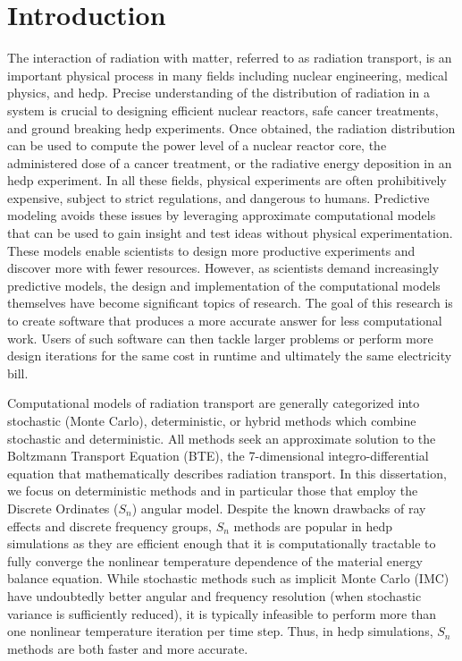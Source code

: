 \documentclass[../doc.tex]{subfiles}
\begin{document}
\chapter{Introduction}
The interaction of radiation with matter, referred to as radiation transport, is an important physical process in many fields including nuclear engineering, medical physics, and \gls{hedp}. Precise understanding of the distribution of radiation in a system is crucial to designing efficient nuclear reactors, safe cancer treatments, and ground breaking \gls{hedp} experiments. Once obtained, the radiation distribution can be used to compute the power level of a nuclear reactor core, the administered dose of a cancer treatment, or the radiative energy deposition in an \gls{hedp} experiment. In all these fields, physical experiments are often prohibitively expensive, subject to strict regulations, and dangerous to humans. Predictive modeling avoids these issues by leveraging approximate computational models that can be used to gain insight and test ideas without physical experimentation. These models enable scientists to design more productive experiments and discover more with fewer resources. However, as scientists demand increasingly predictive models, the design and implementation of the computational models themselves have become significant topics of research. The goal of this research is to create software that produces a more accurate answer for less computational work. Users of such software can then tackle larger problems or perform more design iterations for the same cost in runtime and ultimately the same electricity bill. 

Computational models of radiation transport are generally categorized into stochastic (Monte Carlo), deterministic, or hybrid methods which combine stochastic and deterministic. All methods seek an approximate solution to the Boltzmann Transport Equation (BTE), the 7-dimensional integro-differential equation that mathematically describes radiation transport. In this dissertation, we focus on deterministic methods and in particular those that employ the Discrete Ordinates ($S_n$) angular model. Despite the known drawbacks of ray effects and discrete frequency groups, $S_n$ methods are popular in \gls{hedp} simulations as they are efficient enough that it is computationally tractable to fully converge the nonlinear temperature dependence of the material energy balance equation. While stochastic methods such as implicit Monte Carlo (IMC) have undoubtedly better angular and frequency resolution (when stochastic variance is sufficiently reduced), it is typically infeasible to perform more than one nonlinear temperature iteration per time step. Thus, in \gls{hedp} simulations, $S_n$ methods are both faster and more accurate. 
\end{document}
